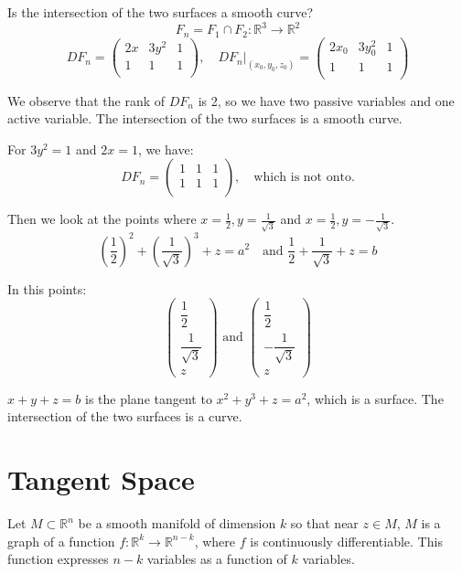 \documentclass[11pt]{article}
\begin{document}
Is the intersection of the two surfaces a smooth curve?
\[
F_n = F_1 \cap F_2 : \mathbb{R}^3 \rightarrow \mathbb{R}^2
\]
\[
DF_n = \begin{pmatrix}
    2x & 3y^2 & 1 \\
    1 & 1 & 1 \\
\end{pmatrix}, \quad DF_n \big|_{(x_0,y_0,z_0)} = \begin{pmatrix}
    2x_0 & 3y_0^2 & 1 \\
    1 & 1 & 1 \\
\end{pmatrix}
\]

We observe that the rank of $DF_n$ is 2, so we have two passive variables and one active variable. The intersection of the two surfaces is a smooth curve.

For $3y^2 = 1$ and $2x = 1$, we have:
\[
DF_n = \begin{pmatrix}
    1 & 1 & 1 \\
    1 & 1 & 1 \\
\end{pmatrix}, \quad \text{which is not onto.}
\]

Then we look at the points where $x = \frac{1}{2}, y = \frac{1}{\sqrt 3}$ and $x = \frac{1}{2}, y = -\frac{1}{\sqrt 3}$.
\[
\left(\frac{1}{2}\right)^2 + \left(\frac{1}{\sqrt 3}\right)^3 + z = a^2 \quad \text{and } \frac{1}{2} + \frac{1}{\sqrt 3} + z = b
\]

In this points:
\[
\begin{pmatrix}
    \dfrac{1}{2} \\
    \dfrac{1}{\sqrt 3} \\
    z
\end{pmatrix} \text{ and } \begin{pmatrix}
    \dfrac{1}{2} \\
    -\dfrac{1}{\sqrt 3} \\
    z
\end{pmatrix}
\]

$x + y + z = b$ is the plane tangent to $x^2 + y^3 + z = a^2$, which is a surface. The intersection of the two surfaces is a curve.

\section{Tangent Space}
Let $M \subset \mathbb{R}^n$ be a smooth manifold of dimension $k$ so that near $z \in M$, $M$ is a graph of a function $f : \mathbb{R}^k \rightarrow \mathbb{R}^{n-k}$, where $f$ is continuously differentiable. This function expresses $n-k$ variables as a function of $k$ variables. 
\end{document}
